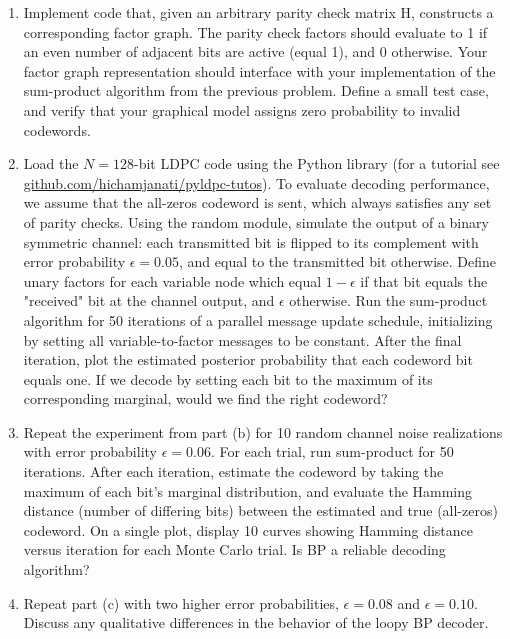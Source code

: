 \documentclass{article}
\begin{document}
\begin{enumerate}
\begin{enumerate}
\item Implement code that, given an arbitrary parity check matrix H, constructs a corresponding factor graph. The parity check factors should evaluate to 1 if an even number of adjacent bits are active (equal 1), and 0 otherwise. Your factor graph representation should interface with your implementation of the sum-product algorithm from the previous problem. Define a small test case, and verify that your graphical model assigns zero probability to invalid codewords.
\item Load the $N = 128$-bit LDPC code using the Python library  (for a tutorial see \url {github.com/hichamjanati/pyldpc-tutos}).  To evaluate decoding
performance, we assume that the all-zeros codeword is sent, which always satisfies any set of parity checks. Using the random module, simulate the output of a binary symmetric
channel: each transmitted bit is flipped to its complement with error probability $\epsilon =0.05$, and equal to the transmitted bit otherwise. Define unary factors for each variable node
which equal $1-\epsilon$ if that bit equals the "received" bit at the channel output, and $\epsilon$ otherwise. Run the sum-product algorithm for 50 iterations of a parallel message update schedule, initializing by setting all variable-to-factor messages to be constant. After the final iteration, plot the estimated posterior probability that each codeword bit equals one.
If we decode by setting each bit to the maximum of its corresponding marginal, would we find the right codeword?
\item Repeat the experiment from part (b) for 10 random channel noise realizations with error probability $\epsilon= 0.06$. For each trial, run sum-product for 50 iterations. After each iteration, estimate the codeword by taking the maximum of each bit's marginal distribution, and evaluate the Hamming distance (number of differing bits) between the estimated and true (all-zeros) codeword. On a single plot, display 10 curves showing Hamming distance versus iteration for each Monte Carlo trial. Is BP a reliable decoding algorithm?
\item Repeat part (c) with two higher error probabilities, $\epsilon = 0.08$ and $\epsilon = 0.10$. Discuss any qualitative differences in the behavior of the loopy BP decoder.

\end{enumerate}
\end{enumerate}
\end{document}
